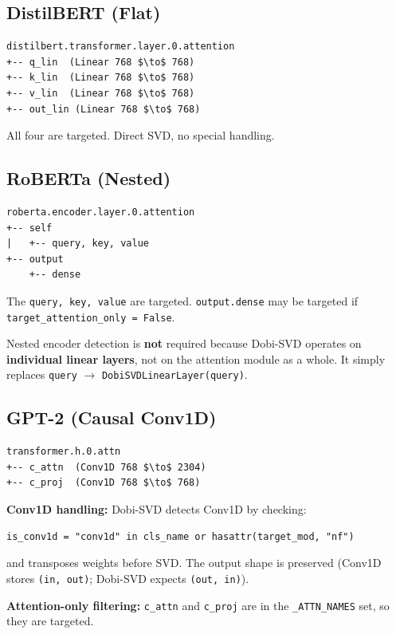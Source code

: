 \subsection{DistilBERT (Flat)}

\begin{lstlisting}
distilbert.transformer.layer.0.attention
+-- q_lin  (Linear 768 $\to$ 768)
+-- k_lin  (Linear 768 $\to$ 768)
+-- v_lin  (Linear 768 $\to$ 768)
+-- out_lin (Linear 768 $\to$ 768)
\end{lstlisting}

All four are targeted. Direct SVD, no special handling.

\subsection{RoBERTa (Nested)}

\begin{lstlisting}
roberta.encoder.layer.0.attention
+-- self
|   +-- query, key, value
+-- output
    +-- dense
\end{lstlisting}

The \texttt{query, key, value} are targeted. \texttt{output.dense} may be targeted if 
\texttt{target\_attention\_only = False}.

Nested encoder detection is \textbf{not} required because Dobi-SVD operates on 
\textbf{individual linear layers}, not on the attention module as a whole. It 
simply replaces \texttt{query} $\to$ \texttt{DobiSVDLinearLayer(query)}.

\subsection{GPT-2 (Causal Conv1D)}

\begin{lstlisting}
transformer.h.0.attn
+-- c_attn  (Conv1D 768 $\to$ 2304)
+-- c_proj  (Conv1D 768 $\to$ 768)
\end{lstlisting}

\textbf{Conv1D handling:} Dobi-SVD detects Conv1D by checking:

\begin{lstlisting}
is_conv1d = "conv1d" in cls_name or hasattr(target_mod, "nf")
\end{lstlisting}

and transposes weights before SVD. The output shape is preserved 
(Conv1D stores \texttt{(in, out)}; Dobi-SVD expects \texttt{(out, in)}).

\textbf{Attention-only filtering:} \texttt{c\_attn} and \texttt{c\_proj} are in the \texttt{\_ATTN\_NAMES} 
set, so they are targeted.

